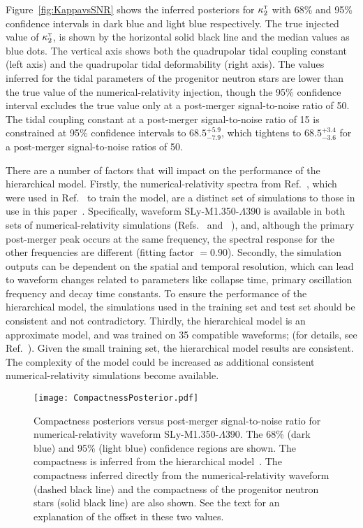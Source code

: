 \documentclass[../Thesis.tex]{subfiles}
\begin{document}
   Figure~\ref{fig:KappavsSNR} shows the inferred posteriors for $\kappa_2^\textsc{t}$ with 68\% and 95\% confidence intervals in dark blue and light blue respectively. 
    The true injected value of $\kappa_2^\textsc{t}$, is shown by the horizontal solid black line and the median values as blue dots. 
    The  vertical axis shows both the quadrupolar tidal coupling constant (left axis) and the quadrupolar tidal deformability (right axis). 
    The values inferred for the tidal parameters of the progenitor neutron stars are lower than the true value of the numerical-relativity injection, though the 95\% confidence interval excludes the true value only at a post-merger signal-to-noise ratio of 50.  
    The tidal coupling constant at a post-merger signal-to-noise ratio of 15 is  constrained at 95\% confidence intervals  to $68.5^{+5.9}_{-7.9}$, which tightens  to $68.5^{+3.4}_{-3.6}$ for  a post-merger signal-to-noise ratios of 50. \par
     There are a number of factors that will impact on the performance of the hierarchical model.
     Firstly, the numerical-relativity spectra from Ref.~\cite{Rezzolla2016}, which were used in Ref.~\cite{Easter2019} to train the model, are a distinct set of simulations to those in use in this paper~\cite{Dietrich2018}.
     Specifically, waveform SLy-M1.350-$\Lambda$390 is available in both sets of numerical-relativity simulations (Refs.~\cite{Dietrich2018} and ~\cite{Rezzolla2016}), and, although the primary post-merger peak occurs at the same frequency, the spectral response for the other frequencies are different (fitting factor $= 0.90$).
     Secondly, the simulation outputs can be dependent on the spatial and temporal resolution, which can lead to waveform changes related to parameters like collapse time, primary oscillation frequency and decay time constants. 
     To ensure the performance of the hierarchical model, the simulations used in the training set and test set should be consistent and not contradictory.
     Thirdly, the hierarchical model is an approximate model, and was  trained on 35 compatible waveforms; (for details, see Ref.~\cite{Easter2019}).
     Given the small training set, the hierarchical model results are consistent. 
     The complexity of the model could be increased as additional consistent numerical-relativity simulations become available. \par
      \begin{figure}[H]
         \centering
         \texttt{[image: CompactnessPosterior.pdf]}
         \caption{Compactness posteriors versus post-merger signal-to-noise ratio for numerical-relativity waveform SLy-M1.350-$\Lambda$390. The 68\% (dark blue) and 95\% (light blue) confidence regions are shown. The compactness is inferred from the hierarchical model~\cite{Easter2019}. The compactness inferred directly from the numerical-relativity waveform (dashed black line) and the compactness of the progenitor neutron stars (solid black line) are also shown. See the text for an explanation of the offset in these two values.}
         \label{fig:CompactnessvsSNR}
     \end{figure}  
\end{document}
